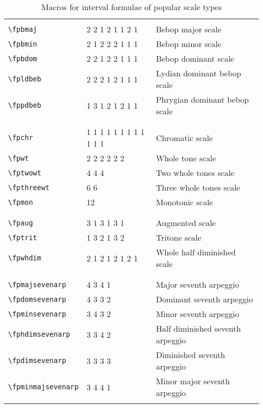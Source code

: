 \documentclass[12pt,letterpaper]{article}
\begin{document}
\begin{table}[H]
\begin{tabular}{|l|l|l|}
\hline

&&\\
\texttt{\textbackslash fpbmaj} & 2 2 1 2 1 1 2 1 & Bebop major scale\\
\texttt{\textbackslash fpbmin} & 2 1 2 2 2 1 1 1 & Bebop minor scale\\
\texttt{\textbackslash fpbdom} & 2 2 1 2 2 1 1 1 & Bebop dominant scale\\
\texttt{\textbackslash fpldbeb} & 2 2 2 1 2 1 1 1 & Lydian dominant bebop scale\\
\texttt{\textbackslash fppdbeb} & 1 3 1 2 1 2 1 1 & Phrygian dominant bebop scale\\
&&\\

\hline

&&\\
\texttt{\textbackslash fpchr} & 1 1 1 1 1 1 1 1 1 1 1 1 & Chromatic scale\\
\texttt{\textbackslash fpwt} & 2 2 2 2 2 2 & Whole tone scale\\
\texttt{\textbackslash fptwowt} & 4 4 4 & Two whole tones scale\\
\texttt{\textbackslash fpthreewt} & 6 6 & Three whole tones scale\\
\texttt{\textbackslash fpmon} & 12 & Monotonic scale\\
&&\\

\hline

&&\\
\texttt{\textbackslash fpaug} & 3 1 3 1 3 1 & Augmented scale\\
\texttt{\textbackslash fptrit} & 1 3 2 1 3 2 & Tritone scale\\
\texttt{\textbackslash fpwhdim} & 2 1 2 1 2 1 2 1 & Whole half diminished scale\\
&&\\

\hline

&&\\
\texttt{\textbackslash fpmajsevenarp} & 4 3 4 1 & Major seventh arpeggio\\
\texttt{\textbackslash fpdomsevenarp} & 4 3 3 2 & Dominant seventh arpeggio\\
\texttt{\textbackslash fpminsevenarp} & 3 4 3 2 & Minor seventh arpeggio\\
\texttt{\textbackslash fphdimsevenarp} & 3 3 4 2 & Half diminished seventh arpeggio\\
\texttt{\textbackslash fpdimsevenarp} & 3 3 3 3 & Diminished seventh arpeggio\\
\texttt{\textbackslash fpminmajsevenarp} & 3 4 4 1 & Minor major seventh arpeggio\\
&&\\

\hline
\end{tabular}\caption{Macros for interval formulae of popular scale types}\end{table}
\normalsize
\end{document}
